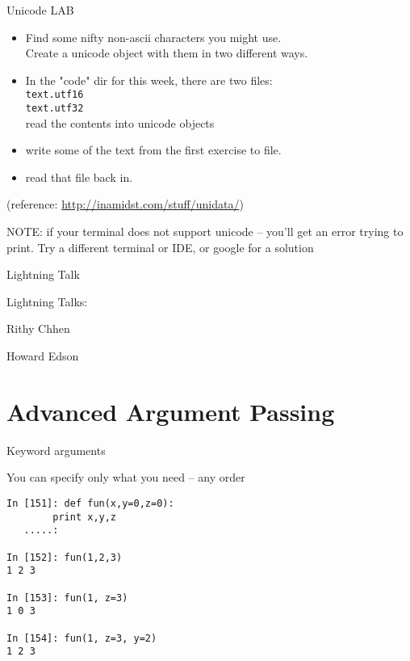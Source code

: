 \documentclass{beamer}
\begin{document}
\begin{frame}[fragile]{Unicode LAB}

\begin{itemize}
  \item Find some nifty non-ascii characters you might use.\\
        Create a unicode object with them in two different ways.
  \item In the "code" dir for this week, there are two files:\\
        \verb|text.utf16| \\
        \verb|text.utf32| \\
        read the contents into unicode objects
  \item write some of the text from the first exercise to file.
  \item read that file back in.
\end{itemize}

\vfill
(reference: \url{http://inamidst.com/stuff/unidata/})

\vfill
NOTE: if your terminal does not support unicode -- you'll get an error trying
to print. Try a different terminal or IDE, or google for a solution
\end{frame}



\begin{frame}{Lightning Talk}

{\LARGE Lightning Talks:}

{\large 
\vfill
Rithy Chhen

\vfill
Howard Edson
}

\end{frame}

\section{Advanced Argument Passing}


\begin{frame}[fragile]{Keyword arguments}

 {\Large You can specify only what you need -- any order}

\begin{verbatim}
In [151]: def fun(x,y=0,z=0):
        print x,y,z
   .....:     

In [152]: fun(1,2,3)
1 2 3

In [153]: fun(1, z=3)
1 0 3

In [154]: fun(1, z=3, y=2)
1 2 3
\end{verbatim}

\end{frame} 
\end{document}
